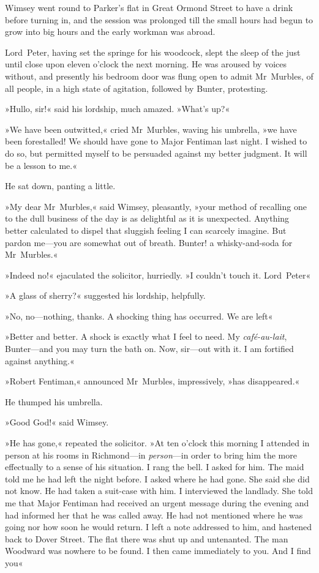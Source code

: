 Wimsey went round to Parker's flat in Great Ormond Street to have a drink before turning in, and the session was prolonged till the small hours had begun to grow into big hours and the early workman was abroad.

Lord~Peter, having set the springe for his woodcock, slept the sleep of the just until close upon eleven o'clock the next morning. He was aroused by voices without, and presently his bedroom door was flung open to admit Mr~Murbles, of all people, in a high state of agitation, followed by Bunter, protesting.

»Hullo, sir!« said his lordship, much amazed. »What's up?«

»We have been outwitted,« cried Mr~Murbles, waving his umbrella, »we have been forestalled! We should have gone to Major Fentiman last night. I wished to do so, but permitted myself to be persuaded against my better judgment. It will be a lesson to me.«

He sat down, panting a little.

»My dear Mr~Murbles,« said Wimsey, pleasantly, »your method of recalling one to the dull business of the day is as delightful as it is unexpected. Anything better calculated to dispel that sluggish feeling I can scarcely imagine. But pardon me—you are somewhat out of breath. Bunter! a whisky-and-soda for Mr~Murbles.«

»Indeed no!« ejaculated the solicitor, hurriedly. »I couldn't touch it. Lord~Peter\longdash«

»A glass of sherry?« suggested his lordship, helpfully.

»No, no—nothing, thanks. A shocking thing has occurred. We are left\longdash«

»Better and better. A shock is exactly what I feel to need. My \textit{café-au-lait}, Bunter—and you may turn the bath on. Now, sir—out with it. I am fortified against anything.«

»Robert Fentiman,« announced Mr~Murbles, impressively, »has disappeared.«

He thumped his umbrella.

»Good God!« said Wimsey.

»He has gone,« repeated the solicitor. »At ten o'clock this morning I attended in person at his rooms in Richmond—in \textit{person}—in order to bring him the more effectually to a sense of his situation. I rang the bell. I asked for him. The maid told me he had left the night before. I asked where he had gone. She said she did not know. He had taken a suit-case with him. I interviewed the landlady. She told me that Major Fentiman had received an urgent message during the evening and had informed her that he was called away. He had not mentioned where he was going nor how soon he would return. I left a note addressed to him, and hastened back to Dover Street. The flat there was shut up and untenanted. The man Woodward was nowhere to be found. I then came immediately to you. And I find you\longdash«

